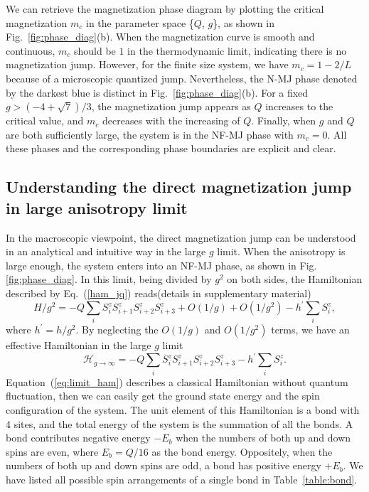 \documentclass[article,10pt,onecolumn,superscriptaddress,floatfix]{revtex4}
\begin{document}
We can retrieve the magnetization phase diagram by plotting the critical magnetization $m_c$ in the parameter space \{$Q$, $g$\}, as shown in Fig.~\ref{fig:phase_diag}(b). When the magnetization curve is smooth and continuous, $m_c$ should be $1$ in the thermodynamic limit, indicating there is no magnetization jump. However, for the finite size system, we have $m_c=1-2/L$ because of a microscopic quantized jump. Nevertheless, the N-MJ phase denoted by the darkest blue is distinct in Fig.~\ref{fig:phase_diag}(b). For a fixed $g>(-4+\sqrt{7})/3$, the magnetization jump appears as $Q$ increases to the critical value, and $m_{c}$ decreases with the increasing of $Q$. Finally, when $g$ and $Q$ are both sufficiently large, the system is in the NF-MJ phase with $m_c=0$. All these phases and the corresponding phase boundaries are explicit and clear.

\subsection{Understanding the direct magnetization jump in large anisotropy limit }
In the macroscopic viewpoint, the direct magnetization jump can be understood in an analytical and intuitive way in the large $g$ limit. When the anisotropy is large enough, the system enters into an NF-MJ phase, as shown in Fig. \ref{fig:phase_diag}. In this limit, being divided by $g^{2}$ on both sides, the Hamiltonian described by Eq.~(\ref{ham_jq}) reads(details in supplementary material)
\begin{equation}
H/g^2  = -Q\sum_{i}S_{i}^{z}S_{i+1}^{z}S_{i+2}^{z}S_{i+3}^{z} + O\left(1/g\right) + O\left(1/g^2\right)-h^{\prime}\sum_{i}S_{i}^{z},
\end{equation}
where $h^{\prime}=h/g^{2}$.
By neglecting the $O(1/g)$ and $O(1/g^{2})$ terms, we have an effective Hamiltonian in the large $g$ limit
\begin{equation}\label{eq:limit_ham}
\mathcal{H}_{g\rightarrow\infty}=-Q\sum_{i}S_{i}^{z}S_{i+1}^{z}S_{i+2}^{z}S_{i+3}^{z}-h^{\prime}\sum_{i}S_{i}^{z}.
\end{equation}
Equation~(\ref{eq:limit_ham}) describes a classical Hamiltonian without quantum fluctuation, then we can easily get the ground state energy and the spin configuration of the system. The unit element of this Hamiltonian is a bond with 4 sites, and the total energy of the system is the summation of all the bonds. A bond contributes negative energy $-E_b$ when the numbers of both up and down spins are even, where $E_b = Q/16$ as the bond energy. Oppositely, when the numbers of both up and down spins are odd, a bond has positive energy $+E_b$. We have listed all possible spin arrangements of a single bond in Table~\ref{table:bond}.
\end{document}
